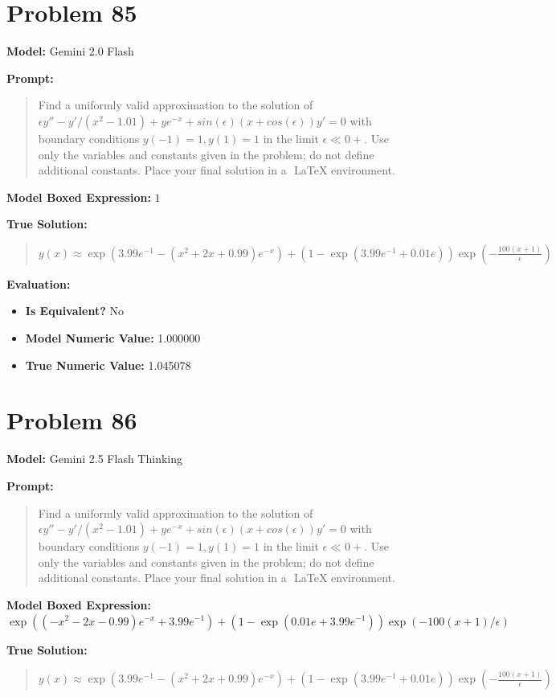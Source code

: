 \documentclass{article}
\begin{document}
{\section*{Problem 85}
\textbf{Model:} Gemini 2.0 Flash

\textbf{Prompt:}
\begin{quote}
Find a uniformly valid approximation to the solution of $\epsilon y'' - y'/(x^2-1.01) + ye^{-x} + sin(\epsilon)(x+cos(\epsilon)) y' = 0$ with boundary conditions $y(-1) = 1, y(1) = 1$ in the limit $\epsilon \ll 0+$. Use only the variables and constants given in the problem; do not define additional constants. Place your final solution in a $\boxed{}$ LaTeX environment.
\end{quote}
\textbf{Model Boxed Expression:} $1$

\textbf{True Solution:}
\begin{quote}
$y(x) \approx \exp(3.99 e^{-1} - (x^2 + 2x + 0.99) e^{-x}) + \left(1 - \exp(3.99 e^{-1} + 0.01 e)\right) \exp\left(-\frac{100(x+1)}{\epsilon}\right)$
\end{quote}

\textbf{Evaluation:}
\begin{itemize}
\item \textbf{Is Equivalent?} No
\item \textbf{Model Numeric Value:} 1.000000
\item \textbf{True Numeric Value:} 1.045078
\end{itemize}
\vspace{1cm}
\section*{Problem 86}
\textbf{Model:} Gemini 2.5 Flash Thinking

\textbf{Prompt:}
\begin{quote}
Find a uniformly valid approximation to the solution of $\epsilon y'' - y'/(x^2-1.01) + ye^{-x} + sin(\epsilon)(x+cos(\epsilon)) y' = 0$ with boundary conditions $y(-1) = 1, y(1) = 1$ in the limit $\epsilon \ll 0+$. Use only the variables and constants given in the problem; do not define additional constants. Place your final solution in a $\boxed{}$ LaTeX environment.
\end{quote}
\textbf{Model Boxed Expression:} $\exp((-x^2-2x-0.99)e^{-x} + 3.99e^{-1}) + (1-\exp(0.01e + 3.99e^{-1}))\exp(-100(x+1)/\epsilon)$

\textbf{True Solution:}
\begin{quote}
$y(x) \approx \exp(3.99 e^{-1} - (x^2 + 2x + 0.99) e^{-x}) + \left(1 - \exp(3.99 e^{-1} + 0.01 e)\right) \exp\left(-\frac{100(x+1)}{\epsilon}\right)$
\end{quote}

}
\end{document}
